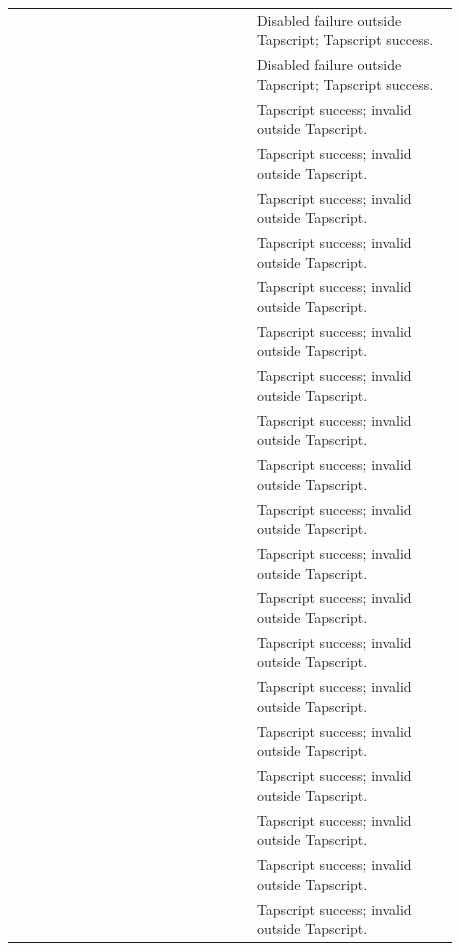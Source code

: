\begin{longtable}{@{}L{0.14\linewidth}L{0.34\linewidth}L{0.40\linewidth}@{}}
 &  & Disabled failure outside Tapscript; Tapscript success. \\
 &  & Disabled failure outside Tapscript; Tapscript success. \\
 &  & Tapscript success; invalid outside Tapscript. \\
 &  & Tapscript success; invalid outside Tapscript. \\
 &  & Tapscript success; invalid outside Tapscript. \\
 &  & Tapscript success; invalid outside Tapscript. \\
 &  & Tapscript success; invalid outside Tapscript. \\
 &  & Tapscript success; invalid outside Tapscript. \\
 &  & Tapscript success; invalid outside Tapscript. \\
 &  & Tapscript success; invalid outside Tapscript. \\
 &  & Tapscript success; invalid outside Tapscript. \\
 &  & Tapscript success; invalid outside Tapscript. \\
 &  & Tapscript success; invalid outside Tapscript. \\
 &  & Tapscript success; invalid outside Tapscript. \\
 &  & Tapscript success; invalid outside Tapscript. \\
 &  & Tapscript success; invalid outside Tapscript. \\
 &  & Tapscript success; invalid outside Tapscript. \\
 &  & Tapscript success; invalid outside Tapscript. \\
 &  & Tapscript success; invalid outside Tapscript. \\
 &  & Tapscript success; invalid outside Tapscript. \\
 &  & Tapscript success; invalid outside Tapscript. \\

\end{longtable}
